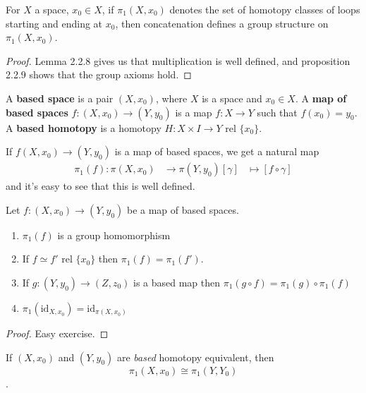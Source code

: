\documentclass{article}
\newcommand{\id}{\mathrm{id}}
\numberwithin{nthm}{subsection}
\begin{document}
\begin{nthm}
    For $X$ a space, $x_0 \in X$, if $\pi_1 (X, x_0)$ denotes the set of homotopy classes of loops starting and ending at $x_0$, then concatenation defines a group structure on $\pi_1(X, x_0)$.
\end{nthm}

\begin{proof}
    Lemma 2.2.8 gives us that multiplication is well defined, and proposition 2.2.9 shows that the group axioms hold.
\end{proof}

\begin{defi}
    A \textbf{based space} is a pair $(X, x_0)$, where $X$ is a space and $x_0 \in X$. A \textbf{map of based spaces} $f:(X, x_0) \to (Y, y_0)$ is a map $f:X \to Y$ such that $f(x_0) = y_0$. A \textbf{based homotopy} is a homotopy $H:X \times I \to Y$ rel $\{x_0\}$.
\end{defi}

\begin{defi}
    If $f(X, x_0) \to (Y, y_0)$ is a map of based spaces, we get a natural map
    \begin{align*}
        \pi_1(f) : \pi(X, x_0) &\to \pi(Y, y_0)
        [\gamma] &\mapsto [f \circ \gamma]
    \end{align*}
    and it's easy to see that this is well defined.
\end{defi}

\begin{nprop}
    Let $f: (X, x_0) \to (Y, y_0)$ be a map of based spaces.
    \begin{enumerate}[label=(\roman*)]
        \item $\pi_1(f)$ is a group homomorphism
        \item If $f \simeq f'$ rel $\{x_0\}$ then $\pi_1(f) = \pi_1(f')$.
        \item If $g: (Y, y_0) \to (Z, z_0)$ is a based map then $\pi_1(g \circ f) = \pi_1(g) \circ \pi_1(f)$
        \item $\pi_1(\id_{X, x_0}) = \id_{\pi(X, x_0)}$
    \end{enumerate}
\end{nprop}

\begin{proof}
    Easy exercise.
\end{proof}

\begin{cor}
    If $(X, x_0)$ and $(Y, y_0)$ are \emph{based} homotopy equivalent, then \begin{equation*}\pi_1(X, x_0) \cong \pi_1(Y, Y_0)\end{equation*}.
\end{cor}
\end{document}
